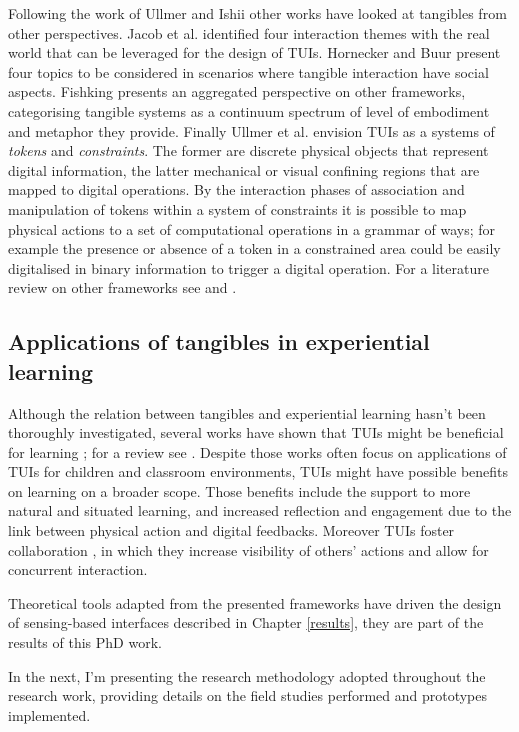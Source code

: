 Following the work of Ullmer and Ishii other works have looked at
tangibles from other perspectives. Jacob et al. \autocite*{Jacob:2008vm}
identified four interaction themes with the real world that can be
leveraged for the design of TUIs. Hornecker and Buur
\autocite*{Hornecker:2006uq} present four topics to be considered in
scenarios where tangible interaction have social aspects. Fishking
\autocite{Fishkin:2004uv} presents an aggregated perspective on other
frameworks, categorising tangible systems as a continuum spectrum of
level of embodiment and metaphor they provide. Finally Ullmer et al.
\autocite{Ullmer:2005jz} envision TUIs as a systems of \emph{tokens} and
\emph{constraints}. The former are discrete physical objects that
represent digital information, the latter mechanical or visual confining
regions that are mapped to digital operations. By the interaction phases
of association and manipulation of tokens within a system of constraints
it is possible to map physical actions to a set of computational
operations in a grammar of ways; for example the presence or absence of
a token in a constrained area could be easily digitalised in binary
information to trigger a digital operation. For a literature review on
other frameworks see \autocite{Mazalek:2009uy} and
\autocite{Shaer:2009fx}.

\subsection{Applications of tangibles in experiential
learning}\label{applications-of-tangibles-in-experiential-learning}

Although the relation between tangibles and experiential learning hasn't
been thoroughly investigated, several works have shown that TUIs might
be beneficial for learning \autocite{Marshall:2007dr}; for a review see
\autocite{omalley:hal-00190328}. Despite those works often focus on
applications of TUIs for children and classroom environments, TUIs might
have possible benefits on learning on a broader scope. Those benefits
include the support to more natural \autocite{Terrenghi:2005gq} and
situated \autocite{Klemmer:2006ez} learning, and increased reflection
and engagement \autocite{Rogers:2006te} due to the link between physical
action and digital feedbacks. Moreover TUIs foster collaboration
\autocite{Rogers:2003tt}, in which they increase visibility of others'
actions and allow for concurrent interaction.

Theoretical tools adapted from the presented frameworks have driven the
design of sensing-based interfaces described in Chapter \ref{results},
they are part of the results of this PhD work.

In the next, I'm presenting the research methodology adopted throughout
the research work, providing details on the field studies performed and
prototypes implemented.
